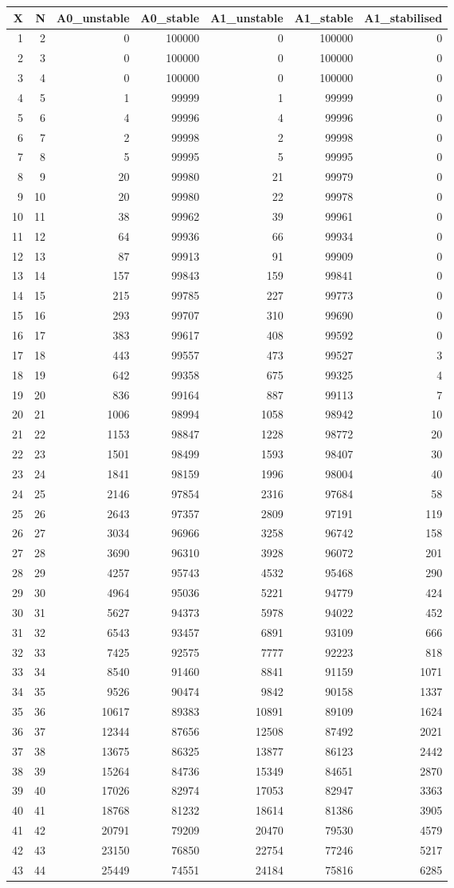 \documentclass[]{article}
\begin{document}
\begin{longtable}[]{@{}rrrrrrr@{}}
\toprule
X & N & A0\_unstable & A0\_stable & A1\_unstable & A1\_stable &
A1\_stabilised\tabularnewline
\midrule
\endhead
1 & 2 & 0 & 100000 & 0 & 100000 & 0\tabularnewline
2 & 3 & 0 & 100000 & 0 & 100000 & 0\tabularnewline
3 & 4 & 0 & 100000 & 0 & 100000 & 0\tabularnewline
4 & 5 & 1 & 99999 & 1 & 99999 & 0\tabularnewline
5 & 6 & 4 & 99996 & 4 & 99996 & 0\tabularnewline
6 & 7 & 2 & 99998 & 2 & 99998 & 0\tabularnewline
7 & 8 & 5 & 99995 & 5 & 99995 & 0\tabularnewline
8 & 9 & 20 & 99980 & 21 & 99979 & 0\tabularnewline
9 & 10 & 20 & 99980 & 22 & 99978 & 0\tabularnewline
10 & 11 & 38 & 99962 & 39 & 99961 & 0\tabularnewline
11 & 12 & 64 & 99936 & 66 & 99934 & 0\tabularnewline
12 & 13 & 87 & 99913 & 91 & 99909 & 0\tabularnewline
13 & 14 & 157 & 99843 & 159 & 99841 & 0\tabularnewline
14 & 15 & 215 & 99785 & 227 & 99773 & 0\tabularnewline
15 & 16 & 293 & 99707 & 310 & 99690 & 0\tabularnewline
16 & 17 & 383 & 99617 & 408 & 99592 & 0\tabularnewline
17 & 18 & 443 & 99557 & 473 & 99527 & 3\tabularnewline
18 & 19 & 642 & 99358 & 675 & 99325 & 4\tabularnewline
19 & 20 & 836 & 99164 & 887 & 99113 & 7\tabularnewline
20 & 21 & 1006 & 98994 & 1058 & 98942 & 10\tabularnewline
21 & 22 & 1153 & 98847 & 1228 & 98772 & 20\tabularnewline
22 & 23 & 1501 & 98499 & 1593 & 98407 & 30\tabularnewline
23 & 24 & 1841 & 98159 & 1996 & 98004 & 40\tabularnewline
24 & 25 & 2146 & 97854 & 2316 & 97684 & 58\tabularnewline
25 & 26 & 2643 & 97357 & 2809 & 97191 & 119\tabularnewline
26 & 27 & 3034 & 96966 & 3258 & 96742 & 158\tabularnewline
27 & 28 & 3690 & 96310 & 3928 & 96072 & 201\tabularnewline
28 & 29 & 4257 & 95743 & 4532 & 95468 & 290\tabularnewline
29 & 30 & 4964 & 95036 & 5221 & 94779 & 424\tabularnewline
30 & 31 & 5627 & 94373 & 5978 & 94022 & 452\tabularnewline
31 & 32 & 6543 & 93457 & 6891 & 93109 & 666\tabularnewline
32 & 33 & 7425 & 92575 & 7777 & 92223 & 818\tabularnewline
33 & 34 & 8540 & 91460 & 8841 & 91159 & 1071\tabularnewline
34 & 35 & 9526 & 90474 & 9842 & 90158 & 1337\tabularnewline
35 & 36 & 10617 & 89383 & 10891 & 89109 & 1624\tabularnewline
36 & 37 & 12344 & 87656 & 12508 & 87492 & 2021\tabularnewline
37 & 38 & 13675 & 86325 & 13877 & 86123 & 2442\tabularnewline
38 & 39 & 15264 & 84736 & 15349 & 84651 & 2870\tabularnewline
39 & 40 & 17026 & 82974 & 17053 & 82947 & 3363\tabularnewline
40 & 41 & 18768 & 81232 & 18614 & 81386 & 3905\tabularnewline
41 & 42 & 20791 & 79209 & 20470 & 79530 & 4579\tabularnewline
42 & 43 & 23150 & 76850 & 22754 & 77246 & 5217\tabularnewline
43 & 44 & 25449 & 74551 & 24184 & 75816 & 6285\tabularnewline

\end{longtable}
\end{document}
